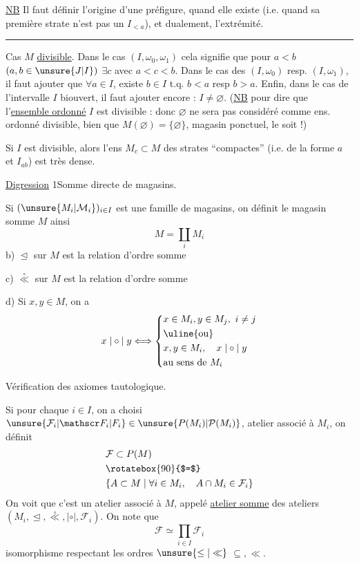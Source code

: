 \uline{NB} Il faut définir l'origine d'une préfigure, quand elle existe (i.e. quand sa première strate  n'est pas un $I_{<a}$), et dualement, l'extrémité.

\begin{center}\rule{2.8cm}{0.4pt}\end{center}

Cas $M$ \uline{divisible}. Dans le cas $(I,\omega_0,\omega_1)$ cela signifie que pour $a<b$ $(a,b\in\unsure{J|I})$ $\exists c$ avec $a<c<b$. Dans le cas des $(I,\omega_0)$ resp. $(I,\omega_1)$, il faut ajouter que $\forall a\in I$, existe $b\in I$ t.q. $b<a$ resp $b>a$. Enfin, dans le cas de l'intervalle $I$ biouvert, il faut  ajouter encore : $I\neq\varnothing$. (\uline{NB} pour dire que l'\uline{ensemble ordonné} $I$ est divisible : donc $\varnothing$ ne sera pas considéré comme ens. ordonné divisible, bien que $M(\varnothing)=\{\varnothing\}$, magasin ponctuel, le soit !)

Si $I$ est divisible, alors l'ens $M_c\subset M$ des strates ``compactes'' (i.e. de la forme $a$ et $I_{ab}$) est très dense.


\uline{Digression} 1\quad Somme directe de magasins.

Si $(\unsure{M_i|\mathcal M_i})_{i\in I}$ est une famille de magasins, on définit le magasin somme $M$ ainsi
\[
M=\coprod_i M_i
\tag*{a)}
\]
b) $\trianglelefteq$ sur $M$ est la relation d'ordre somme

c) $\overset{\circ}{\ll}$ sur $M$ est la relation d'ordre somme

d) Si $x,y\in M$, on a
\[
x\mathrel{|\circ|}y\Longleftrightarrow
\left\{\begin{aligned}
&x\in M_i,y\in M_j,\ i\neq j\\
&\text{\uline{ou}}\\
&x,y\in M_i,\quad x\mathrel{|\circ|}y\\
&\text{au sens de }M_i
\end{aligned}\right.
\]

Vérification des axiomes tautologique.

Si pour chaque $i\in I$, on a choisi $\unsure{\mathcal F_i|\mathscr F_i|F_i}\in\unsure{P(M_i)|\mathcal P(M_i)}$, atelier associé à $M_i$, on définit
\[
\begin{aligned}
&\mathcal F\subset P(M)\\
&\rotatebox{90}{$=$}\\
&\{A\subset M\mid\forall i\in M_i,\quad A\cap M_i\in\mathcal F_i\}
\end{aligned}
\]
On voit que c'est un atelier associé à $M$, appelé \uline{atelier somme} des ateliers $(M_i,\trianglelefteq,\overset{\circ}{\ll},|\circ|,\mathcal F_i)$. On note que
\[
\mathcal F\simeq\prod_{i\in I}\mathcal F_i
\]
isomorphisme respectant les ordres $\unsure{\leq|\ll}$ $\subseteq,\ll$.

